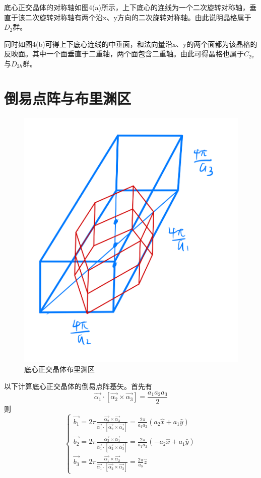 \documentclass{article}
\begin{document}
底心正交晶体的对称轴如图4(a)所示，上下底心的连线为一个二次旋转对称轴，垂直于该二次旋转对称轴有两个沿x、y方向的二次旋转对称轴。由此说明晶格属于$ D_2 $群。


同时如图4(b)可得上下底心连线的中垂面，和法向量沿x、y的两个面都为该晶格的反映面。其中一个面垂直于二重轴，两个面包含二重轴。由此可得晶格也属于$ C_{2v} $与$ D_{2h} $群。

\section{倒易点阵与布里渊区}
	\begin{figure}[!h]
	
	\centering
	\includegraphics[scale=0.2]{布里渊区}
	\caption{\heiti{}底心正交晶体布里渊区}
	
\end{figure}
以下计算底心正交晶体的倒易点阵基矢。首先有
\begin{equation}
	\vec{\alpha_1}\cdot[\vec{\alpha_2}\times\vec{\alpha_3}]=\frac{a_1a_2a_3}{2}
\end{equation}
则
\begin{equation}
	\begin{cases}
		\vec{b_1}=2\pi\frac{\vec{\alpha_2}\times\vec{\alpha_3}}{\vec{\alpha_1}\cdot[\vec{\alpha_2}\times\vec{\alpha_3}]}=\frac{2\pi}{a_1a_2}(a_2\hat{x}+a_1\hat{y})\\
		\vec{b_2}=2\pi\frac{\vec{\alpha_3}\times\vec{\alpha_1}}{\vec{\alpha_1}\cdot[\vec{\alpha_2}\times\vec{\alpha_3}]}=\frac{2\pi}{a_1a_2}(-a_2\hat{x}+a_1\hat{y})\\
		\vec{b_3}=2\pi\frac{\vec{\alpha_1}\times\vec{\alpha_2}}{\vec{\alpha_1}\cdot[\vec{\alpha_2}\times\vec{\alpha_3}]}=\frac{2\pi}{a_3}\hat{z}
	\end{cases}
\end{equation}
\end{document}
